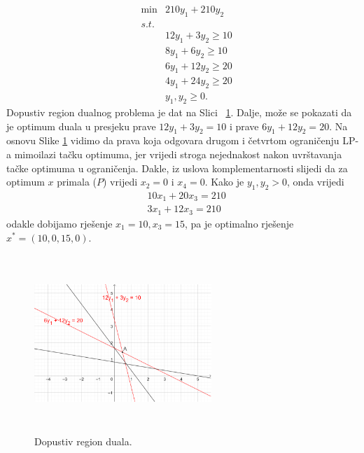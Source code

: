 \documentclass[a4paper, utf8, 11pt, colorlinks]{book}
\theoremstyle{definition}
\begin{document}
$$\begin{array}{lll}
    &\min                    &  210 y_1 + 210 y_2      \\
    &{s.t. }     &  \\
    &            &  12 y_1  + 3   y_2 \geq 10 \\
    &                        &  8  y_1 + 6    y_2 \geq 10 \\
    &                        &  6 y_1 + 12 y_2  \geq 20 \\
    &                        &  4 y_1 + 24 y_2  \geq 20 \\
    &                        &  y_1, y_2 \geq 0.
\end{array}$$
Dopustiv region dualnog problema je dat na Slici~ \ref{fig:fig6-dual-region}. %
Dalje, može se pokazati da je optimum duala u presjeku prave $12 y_1 + 3 y_2 = 10$ i prave $6y_1 + 12 y_2 = 20$. Na osnovu Slike \ref{fig:fig6-dual-region} vidimo da   prava koja odgovara drugom i četvrtom ograničenju LP-a mimoilazi tačku optimuma, jer vrijedi stroga nejednakost nakon uvrštavanja tačke optimuma u ograničenja. Dakle, iz uslova komplementarnosti slijedi da za optimum $x$ primala  ($P$)  vrijedi $x_2 = 0$ i $x_4 = 0$.  Kako je $y_1, y_2 > 0$, onda vrijedi 
\begin{align}
    &10 x_1 + 20 x_3 = 210 \nonumber \\
    & 3x_1 + 12 x_3  = 210 \nonumber
\end{align}
odakle dobijamo rješenje $x_1 = 10, x_3 = 15$, pa je optimalno rješenje $x^* = (10, 0, 15, 0)$.

\begin{figure}[H]
    \centering
    \includegraphics[width=190pt, height=190pt]{fig6.eps}
    \caption{Dopustiv region duala.}
    \label{fig:fig6-dual-region}
\end{figure}
\end{document}
